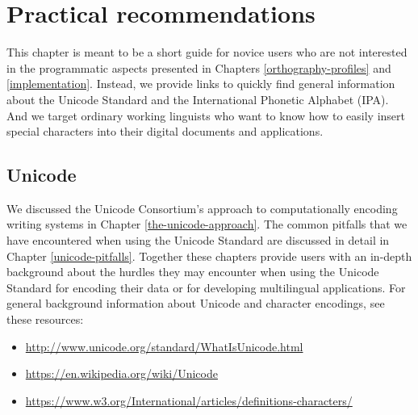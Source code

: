 \chapter{Practical recommendations}
\label{practical-recommendations}


This chapter is meant to be a short guide for novice users who are not interested in the programmatic aspects presented in Chapters \ref{orthography-profiles} and \ref{implementation}. Instead, we provide links to quickly find general information about the Unicode Standard and the International Phonetic Alphabet (IPA). And we target ordinary working linguists who want to know how to easily insert special characters into their digital documents and applications.

\section{Unicode}
We discussed the Unicode Consortium's approach to computationally encoding writing systems in Chapter \ref{the-unicode-approach}. The common pitfalls that we have encountered when using the Unicode Standard are discussed in detail in Chapter \ref{unicode-pitfalls}. Together these chapters provide users with an in-depth background about the hurdles they may encounter when using the Unicode Standard for encoding their data or for developing multilingual applications. For general background information about Unicode and character encodings, see these resources:

\begin{itemize}
	\item \url{http://www.unicode.org/standard/WhatIsUnicode.html}
	\item \url{https://en.wikipedia.org/wiki/Unicode}
	\item \url{https://www.w3.org/International/articles/definitions-characters/}
\end{itemize}

